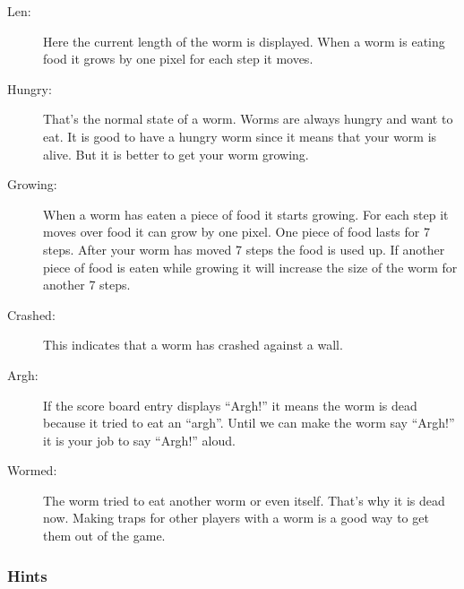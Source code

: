 \begin{description}
\item[Len:]
Here the current length of the worm is displayed. When a worm is eating
food it grows by one pixel for each step it moves.

\item[Hungry:]
That's the normal state of a worm. Worms are always
hungry and want to eat. It is good to have a hungry
worm since it means that your worm is alive. But it is
better to get your worm growing.

\item[Growing:]
When a worm has eaten a piece of food it starts growing. For each step
it moves over food it can grow by one pixel. One piece of food lasts
for 7 steps. After your worm has moved 7 steps the food is used up. If
another piece of food is eaten while growing it will increase the size
of the worm for another 7 steps.

\item[Crashed:]
This indicates that a worm has crashed against a wall.

\item[Argh:]
If the score board entry displays ``Argh!'' it
means the worm is dead because it tried to eat an ``argh''. Until we
can make the worm say ``Argh!'' it is your job to say ``Argh!'' aloud.

\item[Wormed:]
The worm tried to eat another worm or even itself.
That's why it is dead now.  Making traps for other players with a worm
is a good way to get them out of the game.
\end{description}

\subsubsection{Hints}

